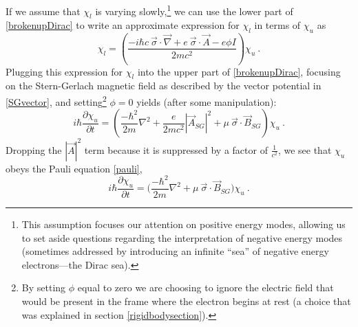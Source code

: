 \documentclass[12pt,secnumarabic,amsmath,amssymb,balancelastpage,nofootinbib]{article}
\begin{document}
If we assume that $\chi_l$ is varying slowly,\footnote{This assumption focuses our attention on positive energy modes, allowing us to set aside questions regarding the interpretation of negative energy modes (sometimes addressed by introducing an infinite ``sea'' of negative energy electrons---the Dirac sea).} we can use the lower part of \eqref{brokenupDirac} to write an approximate expression for $\chi_l$ in terms of $\chi_u$ as
\begin{equation}
\chi_l = \left( \frac{- i \hbar c \: \vec{\sigma}\cdot\vec{\nabla} + e \: \vec{\sigma}\cdot\vec{A}-e\phi I}{2 m c^2}\right)\chi_u
\ .
\label{upperlower}
\end{equation}
Plugging this expression for $\chi_l$ into the upper part of \eqref{brokenupDirac}, focusing on the Stern-Gerlach magnetic field as described by the vector potential in \eqref{SGvector}, and setting\footnote{By setting $\phi$ equal to zero we are choosing to ignore the electric field that would be present in the frame where the electron begins at rest (a choice that was explained in section \ref{rigidbodysection}).} $\phi=0$ yields (after some manipulation):
\begin{equation}
i \hbar \frac{\partial \chi_u}{\partial t} =\left( \frac{-\hbar^2}{2 m} \nabla^2 + \frac{e}{2 m c^2} |\vec{A}_{SG}|^2 + \mu\: \vec{\sigma} \cdot \vec{B}_{SG} \right) \chi_u
\ .
\label{almostpauli}
\end{equation}
Dropping the $|\vec{A}|^2$ term because it is suppressed by a factor of $\frac{1}{c^2}$, we see that $\chi_u$ obeys the Pauli equation \eqref{pauli},
\begin{equation}
i \hbar \frac{\partial \chi_u}{\partial t} = \Big(\frac{- \hbar^2}{2 m}\nabla^2+\mu\: \vec{\sigma} \cdot \vec{B}_{SG} \Big)\chi_u
\ .
\label{pauli2}
\end{equation}
\end{document}
